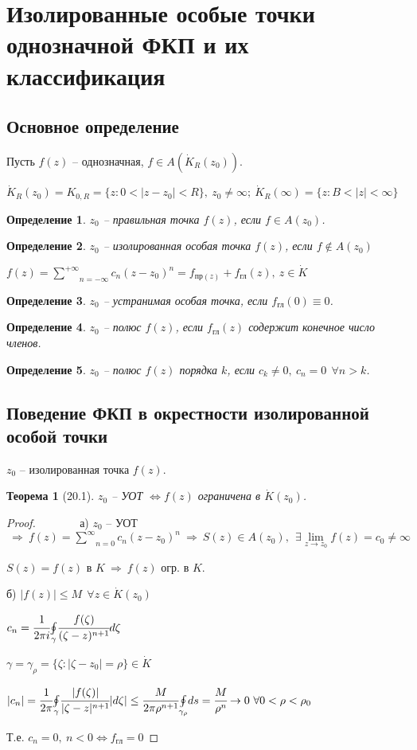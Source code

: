 \documentclass[final]{report}
\newcommand{\forcenewline}{$\phantom{\mbox{newline}}$\newline}
\newcommand{\then}{\ \Rightarrow\ }
\newcommand{\moint}[1]{\underset{#1}{\oint}}
\newcommand{\msum}[2]{\underset{#1}{\overset{#2}{\sum}}}
\newcommand{\ssum}{\msum{n=0}{\infty}}
\newcommand{\lsum}{\msum{n=-\infty}{+\infty}}
\newcommand{\mlim}[1]{\underset{#1}{\lim}}
\newcommand{\LRA}{\Leftrightarrow}
\newcommand{\g}{\gamma}
\newcommand{\E}{\ \exists}
\newcommand{\F}{\ \forall}
\newcommand{\opr}[1]{\begin{opred}#1\end{opred}}
\newtheorem*{theor}{Теорема}
\newtheorem*{opred}{Определение}
\theoremstyle{remark}
\begin{document}
\newpage

\section{Изолированные особые точки однозначной ФКП и их классификация}

\subsection{Основное определение}

Пусть $f(z)$ -- однозначная, $f\in A(\dot{K}_R(z_0))$.

$\dot{K}_R(z_0)=K_{0,R}=\{z\colon0<|z-z_0|<R\},\ z_0\neq\infty;\ \dot{K}_R(\infty)=\{z\colon B<|z|<\infty\}$
\opr{$z_0$ -- правильная точка $f(z)$, если $f\in A(z_0)$.}
\opr{$z_0$ -- изолированная особая точка $f(z)$, если $f\not\in A(z_0)$}
$f(z)=\lsum c_n(z-z_0)^n=f_{\mbox{пр}(z)}+f_{\mbox{гл}}(z),\ z\in\dot{K}$
\opr{$z_0$ -- устранимая особая точка, если $f_{\mbox{гл}}(0)\equiv0$.}
\opr{$z_0$ -- полюс $f(z)$, если $f_{\mbox{гл}}(z)$ содержит конечное число членов.}
\opr{$z_0$ -- полюс $f(z)$ порядка $k$, если $c_k\neq0,\ c_n=0\ \F n>k$.}

\subsection{Поведение ФКП в окрестности изолированной особой точки}

$z_0$ -- изолированная точка $f(z)$.
\begin{theor}[20.1]
$z_0$ -- УОТ $\LRA f(z)$ ограничена в $\dot{K}(z_0)$.
\end{theor}
\begin{proof}
\forcenewline
а) $z_0$ -- УОТ $\then f(z)=\ssum c_n(z-z_0)^n\then S(z)\in A(z_0),\ \E \mlim{z\to z_0}f(z)=c_0\neq\infty$

$S(z)=f(z)$ в $K \then f(z)$ огр. в $K$.

б) $|f(z)|\leq M\ \F z\in\dot{K}(z_0)$

$c_n=\cfrac{1}{2\pi i}\moint{\gamma}\cfrac{f(\zeta)}{(\zeta-z)^{n+1}}d\zeta$

$\g=\g_\rho=\{\zeta\colon|\zeta-z_0|=\rho\}\in\dot{K}$

$|c_n|=\cfrac{1}{2\pi}\moint{\gamma}\cfrac{|f(\zeta)|}{|\zeta-z|^{n+1}}|d\zeta|\leq \cfrac{M}{2\pi\rho^{n+1}}\moint{\g_\rho}ds=\cfrac{M}{\rho^n}\to0 \F0<\rho<\rho_0$

Т.е. $c_n=0,\ n<0\LRA f_{\mbox{гл}}=0$
\end{proof}
\end{document}

